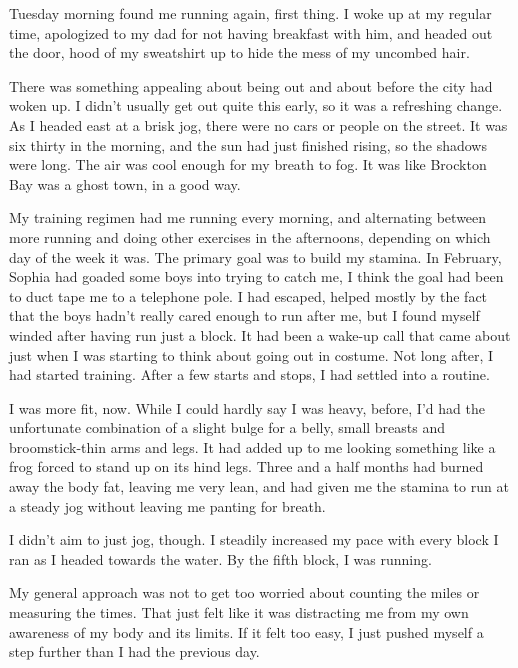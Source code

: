





Tuesday morning found me running again, first thing.  I woke up at my regular time, apologized to my dad for not having breakfast with him, and headed out the door, hood of my sweatshirt up to hide the mess of my uncombed hair.



There was something appealing about being out and about before the city had woken up.  I didn't usually get out quite this early, so it was a refreshing change.  As I headed east at a brisk jog, there were no cars or people on the street.  It was six thirty in the morning, and the sun had just finished rising, so the shadows were long.  The air was cool enough for my breath to fog.  It was like Brockton Bay was a ghost town, in a good way.



My training regimen had me running every morning, and alternating between more running and doing other exercises in the afternoons, depending on which day of the week it was.  The primary goal was to build my stamina.  In February, Sophia had goaded some boys into trying to catch me, I think the goal had been to duct tape me to a telephone pole.  I had escaped, helped mostly by the fact that the boys hadn't really cared enough to run after me, but I found myself winded after having run just a block.  It had been a wake-up call that came about just when I was starting to think about going out in costume.  Not long after, I had started training.  After a few starts and stops, I had settled into a routine.



I was more fit, now.  While I could hardly say I was heavy, before, I'd had the unfortunate combination of a slight bulge for a belly, small breasts and broomstick-thin arms and legs.  It had added up to me looking something like a frog forced to stand up on its hind legs.  Three and a half months had burned away the body fat, leaving me very lean, and had given me the stamina to run at a steady jog without leaving me panting for breath.



I didn't aim to just jog, though.  I steadily increased my pace with every block I ran as I headed towards the water.  By the fifth block, I was running.



My general approach was not to get too worried about counting the miles or measuring the times.  That just felt like it was distracting me from my own awareness of my body and its limits.  If it felt too easy, I just pushed myself a step further than I had the previous day.



